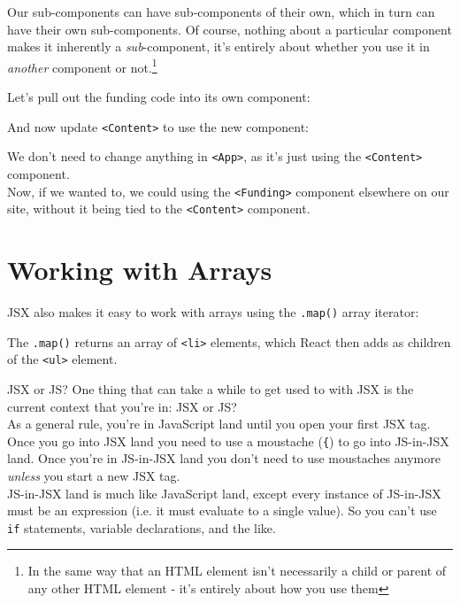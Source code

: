 Our sub-components can have sub-components of their own, which in turn can have their own sub-components. Of course, nothing about a particular component makes it inherently a \textit{sub}-component, it's entirely about whether you use it in \textit{another} component or not.\footnote{In the same way that an HTML element isn't necessarily a child or parent of any other HTML element - it's entirely about how you use them}


\pagebreak


Let's pull out the funding code into its own component:


And now update \texttt{<Content>} to use the new component:


We don't need to change anything in \texttt{<App>}, as it's just using the \texttt{<Content>} component.
\\

Now, if we wanted to, we could using the \texttt{<Funding>} component elsewhere on our site, without it being tied to the \texttt{<Content>} component.


\section{Working with Arrays}


JSX also makes it easy to work with arrays using the \texttt{.map()} array iterator:


The \texttt{.map()} returns an array of \texttt{<li>} elements, which React then adds as children of the \texttt{<ul>} element.

\pagebreak

\begin{infobox}{JSX or JS?}
    One thing that can take a while to get used to with JSX is the current context that you're in: JSX or JS?
    \\

    As a general rule, you're in JavaScript land until you open your first JSX tag. Once you go into JSX land you need to use a moustache (\texttt{\{}) to go into JS-in-JSX land. Once you're in JS-in-JSX land you don't need to use moustaches anymore \textit{unless} you start a new JSX tag.
    \\

    JS-in-JSX land is much like JavaScript land, except every instance of JS-in-JSX must be an expression (i.e. it must evaluate to a single value). So you can't use \texttt{if} statements, variable declarations, and the like.

\end{infobox}


